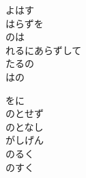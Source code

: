 \documentclass[10pt,b5j]{tarticle} %
\begin{document}
\begin{enumerate}
\begin{minipage}[c]{\blocksize}
        \vspace{\linespace}
        \item
        よはす\\
        はらずを\\
        のは\\
        れるにあらずして\\
        たるの\\
        はの
        
        \vspace{\linespace}
        \item
        をに\\
        のとせず\\
        のとなし\\
        がしげん\\
        のるく\\
        のすく
    
    \end{minipage}
\end{enumerate} %
\end{document}
